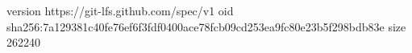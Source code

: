 version https://git-lfs.github.com/spec/v1
oid sha256:7a129381c40fe76ef6f3fdf0400ace78fcb09cd253ea9fc80e23b5f298bdb83e
size 262240
